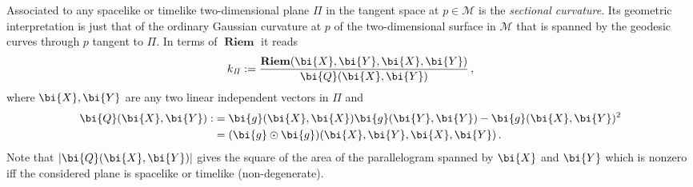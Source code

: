 \documentclass
[rmp,aps,twocolumn,showpacs,preprintnumbers,amsmath,amssymb]{revtex4}
\theoremstyle{plain}
\theoremstyle{definition}
\theoremstyle{remark}
\newcommand{\br}[1]{\mathbf{#1}}              %
\newcommand{\Plane}{\mathit{\Pi}}             %
\newcommand{\abs}[1]{\lvert#1\rvert}          %
\DeclareMathOperator{\Riem}{\br{Riem}}        %
\newcommand{\M}{\mathcal{M}}                      %
\newcommand{\g}{\bg}                            %
\newcommand{\bg}{\bi{g}}
\newcommand{\bQ}{\bi{Q}}
\newcommand{\bX}{\bi{X}}
\newcommand{\bY}{\bi{Y}}
\begin{document}
Associated to any spacelike or timelike two-dimensional plane $\Plane$ 
in the tangent space at $p\in\M$ is the \emph{sectional curvature}. Its 
geometric interpretation is just that of the ordinary Gaussian curvature 
at $p$ of the two-dimensional surface in $\M$ that is spanned by the 
geodesic curves through $p$ tangent to $\Plane$. In terms of $\Riem$
it reads    
%
\begin{equation}\label{eq:sectional-curvature}
  k_\Plane := \frac{\Riem(\bX,\bY,\bX,\bY)}{\bQ(\bX,\bY)} \,,
\end{equation}
%
where $\bX,\bY$ are any two linear independent vectors in $\Plane$ and 
%
\begin{equation}\label{eq:area-spanned}
\begin{split}
  \bQ(\bX,\bY) 
  :&= \g(\bX,\bX)\g(\bY,\bY) - \g(\bX,\bY)^2 \\
   &= (\g\odot\g)(\bX,\bY,\bX,\bY) \,. \\
\end{split}
\end{equation}
%
Note that $\abs{\bQ(\bX,\bY)}$ gives the square of the area of the 
parallelogram spanned by $\bX$ and $\bY$ which is nonzero iff the considered
plane is spacelike or timelike (non-degenerate).
\end{document}
